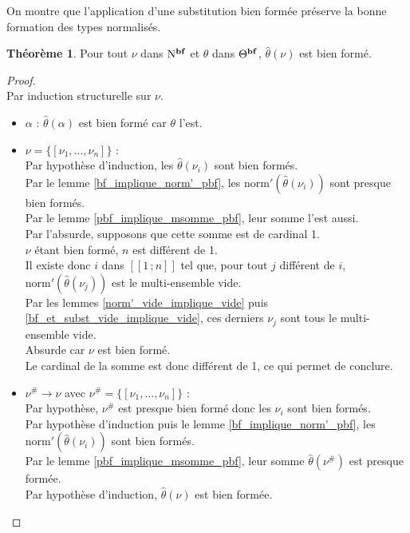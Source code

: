 \documentclass[a4paper]{report}
\newenvironment{preuve} 
	{\begin{proof}~\\} 
	{\end{proof}}
\theoremstyle{definition}
\newtheorem{theoreme}{Théorème}
\newcommand{\interval}[2]{[\![#1\,;#2]\!]}
\newcommand{\mset}[1]{\{\![#1]\!\}}
\newcommand{\norm}{\mathrm{norm}}
\newcommand{\N}{\mathrm{N}}
\begin{document}
On montre que l'application d'une substitution bien formée préserve la bonne formation des types normalisés.

\begin{theoreme} \label{bf_implique_subst_bf}
	Pour tout $\nu$ dans $\N^{\bold{bf}}$ et $\theta$ dans $\Theta^{\bold{bf}}$, $\hat\theta (\nu)$ est bien formé.
\end{theoreme}

\begin{preuve}
	Par induction structurelle sur $\nu$.
	\begin{itemize}[label={\textbf{Cas}}]
		\item
			$\alpha$ : $\hat\theta (\alpha)$ est bien formé car $\theta$ l'est.
		\item
			$\nu = \mset{\nu_1, \dots, \nu_n}$ : \\
			Par hypothèse d'induction, les $\hat\theta (\nu_i)$ sont bien formés. \\
			Par le lemme \ref{bf_implique_norm'_pbf}, les $\norm' (\hat\theta (\nu_i))$ sont presque bien formés. \\
			Par le lemme \ref{pbf_implique_msomme_pbf}, leur somme l'est aussi. \\
			Par l'absurde, supposons que cette somme est de cardinal 1. \\
			$\nu$ étant bien formé, $n$ est différent de 1. \\
			Il existe donc $i$ dans $\interval 1 n$ tel que, pour tout $j$ différent de $i$, $\norm' (\hat\theta (\nu_j))$ est le multi-ensemble vide. \\
			Par les lemmes \ref{norm'_vide_implique_vide} puis \ref{bf_et_subst_vide_implique_vide}, ces derniers $\nu_j$ sont tous le multi-ensemble vide. \\
			Absurde car $\nu$ est bien formé. \\
			Le cardinal de la somme est donc différent de 1, ce qui permet de conclure.
		\item
			$\nu^\# \rightarrow \nu$ avec $\nu^\# = \mset{\nu_1, \dots, \nu_n}$ : \\
			Par hypothèse, $\nu^\#$ est presque bien formé donc les $\nu_i$ sont bien formés. \\
			Par hypothèse d'induction puis le lemme \ref{bf_implique_norm'_pbf}, les $\norm' (\hat\theta (\nu_i))$ sont bien formés. \\
			Par le lemme \ref{pbf_implique_msomme_pbf}, leur somme $\hat\theta (\nu^\#)$ est presque formée. \\
			Par hypothèse d'induction, $\hat\theta (\nu)$ est bien formée.

\end{itemize}
\end{preuve}
\end{document}

